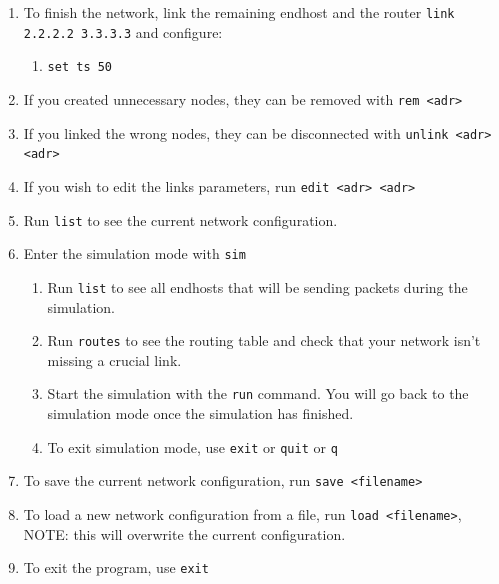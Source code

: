 \begin{enumerate}
\begin{enumerate}
    \end{enumerate}
    \item To finish the network, link the remaining endhost and the router \texttt{link 2.2.2.2 3.3.3.3} and configure:
    \begin{enumerate}
        \item \texttt{set ts 50} 
    \end{enumerate}
    \item If you created unnecessary nodes, they can be removed with \texttt{rem <adr>}
    \item If you linked the wrong nodes, they can be disconnected with \texttt{unlink <adr> <adr>}
    \item If you wish to edit the links parameters, run \texttt{edit <adr> <adr>}
    \item Run \texttt{list} to see the current network configuration.
    \item Enter the simulation mode with \texttt{sim}
    \begin{enumerate}
        \item Run \texttt{list} to see all endhosts that will be sending packets during the simulation.
        \item Run \texttt{routes} to see the routing table and check that your network isn't missing a crucial link.
        \item Start the simulation with the \texttt{run} command. You will go back to the simulation mode once the simulation has finished.
        \item To exit simulation mode, use \texttt{exit} or \texttt{quit} or \texttt{q}
    \end{enumerate}
    \item To save the current network configuration, run \texttt{save <filename>}
    \item To load a new network configuration from a file, run \texttt{load <filename>}, NOTE: this will overwrite the current configuration.
    \item To exit the program, use \texttt{exit}
\end{enumerate}

